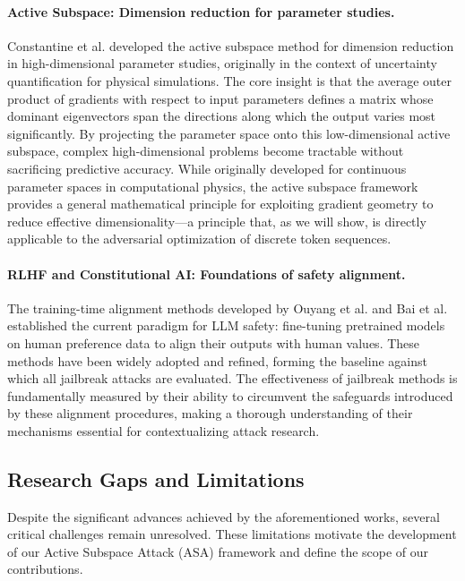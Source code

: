 \documentclass[preprint,12pt]{elsarticle}
\begin{document}
\paragraph{Active Subspace: Dimension reduction for parameter studies.} Constantine et al. \cite{constantine2014active, constantine2015active} developed the active subspace method for dimension reduction in high-dimensional parameter studies, originally in the context of uncertainty quantification for physical simulations. The core insight is that the average outer product of gradients with respect to input parameters defines a matrix whose dominant eigenvectors span the directions along which the output varies most significantly. By projecting the parameter space onto this low-dimensional active subspace, complex high-dimensional problems become tractable without sacrificing predictive accuracy. While originally developed for continuous parameter spaces in computational physics, the active subspace framework provides a general mathematical principle for exploiting gradient geometry to reduce effective dimensionality---a principle that, as we will show, is directly applicable to the adversarial optimization of discrete token sequences.

\paragraph{RLHF and Constitutional AI: Foundations of safety alignment.} The training-time alignment methods developed by Ouyang et al. \cite{ouyang2022training} and Bai et al. \cite{bai2022constitutional} established the current paradigm for LLM safety: fine-tuning pretrained models on human preference data to align their outputs with human values. These methods have been widely adopted and refined, forming the baseline against which all jailbreak attacks are evaluated. The effectiveness of jailbreak methods is fundamentally measured by their ability to circumvent the safeguards introduced by these alignment procedures, making a thorough understanding of their mechanisms essential for contextualizing attack research.

\subsection{Research Gaps and Limitations}
\label{sec:gaps}

Despite the significant advances achieved by the aforementioned works, several critical challenges remain unresolved. These limitations motivate the development of our Active Subspace Attack (ASA) framework and define the scope of our contributions.
\end{document}
